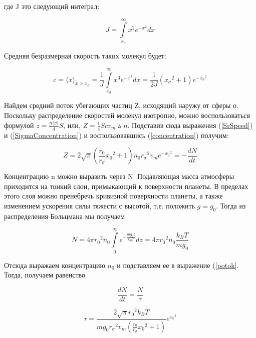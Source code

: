 \documentclass[a4paper,12pt]{article}
\begin{document}
где J это следующий интеграл:

\begin{equation}\label{integral}
	J = \int\limits_{x_{\sigma}}^{\infty} x^2e^{-x^2} dx
\end{equation}
 

Средняя безразмерная скорость таких молекул будет:

\begin{equation}\label{SrSpeed}
	c = {\langle x \rangle}_{x>x_{\sigma}} = \frac{1}{J}\int\limits_{x_{\sigma}}^{\infty} x^3e^{-x^2} dx = \frac{1}{2J}({x_{\sigma}}^2 + 1)e^{-{x_{\sigma}}^2}
\end{equation}

Найдем средний поток убегающих частиц Z, исходящий наружу от сферы о.
Поскольку распределение скоростей молекул изотропно, можно воспользоваться
формулой $z = \frac{n \langle v \rangle}{4}S$, или, $Z = \frac{1}{4} Scv_m\vartriangle n$. Подставив сюда выражения (\ref{SrSpeed}) и (\ref{SigmaConcentration}) и воспользовавшись (\ref{concentration}) получим:

\begin{equation}\label{potok}
	Z = 2\sqrt{\pi}(\frac{r_0}{r_{\sigma}}{x_0}^2 + 1)n_0{r_{\sigma}}^2v_me^{-{x_0}^2} = -\frac{dN}{dt}
\end{equation}

Концентрацию n можно выразить через N. Подавляющая масса атмосферы
приходится на тонкий слон, примыкающий к поверхности планеты. В пределах
этого слоя можно пренебречь кривизной поверхности планеты, а также изменением ускорения силы тяжести с высотой, т.е. положить $g = g_0$. Тогда из распределения Больцмана мы получаем

\begin{equation}
	N = 4\pi {r_0}^2n_0 \int\limits_0^{\infty} e^{-\frac{mg_0z}{k_BT}}dz = 4\pi {r_0}^2n_0 \frac{k_BT}{mg_0}
\end{equation}


Отсюда выражаем концентрацию $n_0$ и подставляем ее в выражение (\ref{potok}. Тогда, получаем равенство 

\begin{equation}\label{dNdt}
	\frac{dN}{dt} = \frac{N}{\tau}
\end{equation}   	

\begin{equation}\label{tau}
 \tau = \frac{2\sqrt{\pi} {r_0}^2 k_B T}{m g_0 {r_{\sigma}}^2v_m(\frac{r_0}{r_{\sigma}}{x_0}^2 + 1)}e^{{x_0}^2}
\end{equation}
\end{document}
